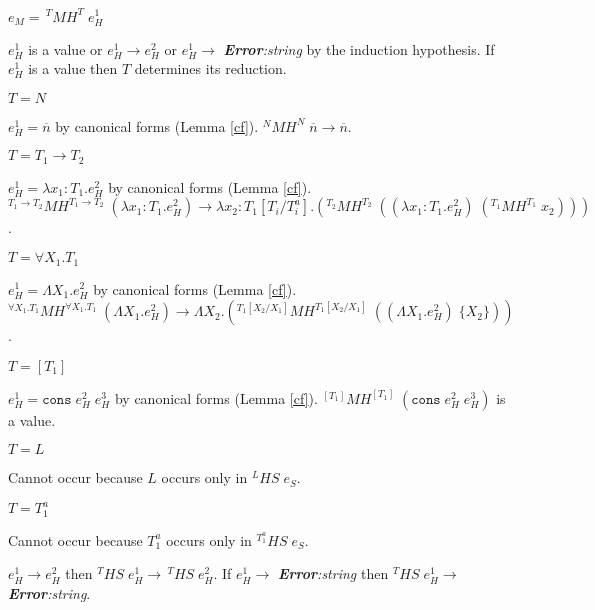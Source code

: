 \begin{case}
$e_{M}=\,^{T}MH^{T}\;e_{H}^{1}$

$e_{H}^{1}$ is a value or $e_{H}^{1}\rightarrow e_{H}^{2}$ or $e_{H}^{1}\rightarrow$ \emph{\textbf{Error}:\;string} by the induction hypothesis.  If $e_{H}^{1}$ is a value then $T$ determines its reduction.
\begin{subcase}
$T=N$

$e_{H}^{1}=\overline{n}$ by canonical forms (Lemma \ref{cf}).  $^{N}MH^{N}\;\overline{n}\rightarrow\overline{n}$.
\end{subcase}
\begin{subcase}
$T=T_{1}\rightarrow T_{2}$

$e_{H}^{1}=\lambda x_{1}:T_{1}.e_{H}^{2}$ by canonical forms (Lemma \ref{cf}).  $^{T_{1}\rightarrow T_{2}}MH^{T_{1}\rightarrow T_{2}}\;(\lambda x_{1}:T_{1}.e_{H}^{2})\rightarrow\lambda x_{2}:T_{1}[T_{i}/T^{a}_{i}].(^{T_{2}}MH^{T_{2}}\;((\lambda x_{1}:T_{1}.e_{H}^{2})\;(^{T_{1}}MH^{T_{1}}\;x_{2})))$.
\end{subcase}
\begin{subcase}
$T=\forall X_{1}.T_{1}$

$e_{H}^{1}=\Lambda X_{1}.e_{H}^{2}$ by canonical forms (Lemma \ref{cf}).  $^{\forall X_{1}.T_{1}}MH^{\forall X_{1}.T_{1}}\;(\Lambda X_{1}.e_{H}^{2})\rightarrow\Lambda X_{2}.(^{T_{1}[X_{2}/X_{1}]}MH^{T_{1}[X_{2}/X_{1}]}\;((\Lambda X_{1}.e_{H}^{2})\;\lbrace X_{2}\rbrace))$.
\end{subcase}
\begin{subcase}
$T=[T_{1}]$

$e_{H}^{1}=\mathtt{cons}\;e_{H}^{2}\;e_{H}^{3}$ by canonical forms (Lemma \ref{cf}).  $^{[T_{1}]}MH^{[T_{1}]}\;(\mathtt{cons}\;e_{H}^{2}\;e_{H}^{3})$ is a value.
\end{subcase}
\begin{subcase}
$T=L$

Cannot occur because $L$ occurs only in $^{L}HS\;e_{S}$.
\end{subcase}
\begin{subcase}
$T=T_{1}^{a}$

Cannot occur because $T_{1}^{a}$ occurs only in $^{T_{1}^{a}}HS\;e_{S}$.
\end{subcase}
$e_{H}^{1}\rightarrow e_{H}^{2}$ then $^{T}HS\;e_{H}^{1}\rightarrow\,^{T}HS\;e_{H}^{2}$.  If $e_{H}^{1}\rightarrow$ \emph{\textbf{Error}:\;string} then $^{T}HS\;e_{H}^{1}\rightarrow$ \emph{\textbf{Error}:\;string}.
\end{case}